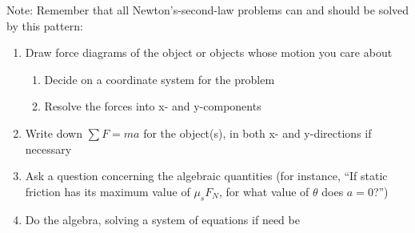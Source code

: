 \documentclass[12pt]{article}
\begin{document}
\Large
\centerline{}
\normalsize
\centerline{}

\bf

Note: \rm Remember that all Newton's-second-law problems can and should be solved by this pattern:

\begin{enumerate}

\item Draw force diagrams of the object or objects whose motion you care about
\begin{enumerate}
\item Decide on a coordinate system for the problem
\item Resolve the forces into x- and y-components
\end{enumerate}
\item Write down $\sum F = ma$ for the object(s), in both x- and y-directions if necessary
\item Ask a question concerning the algebraic quantities (for instance, ``If static friction has its maximum value of $\mu_s F_N$, for what value of $\theta$ does $a=0$?'')
\item Do the algebra, solving a system of equations if need be
\end{enumerate}
\end{document}
